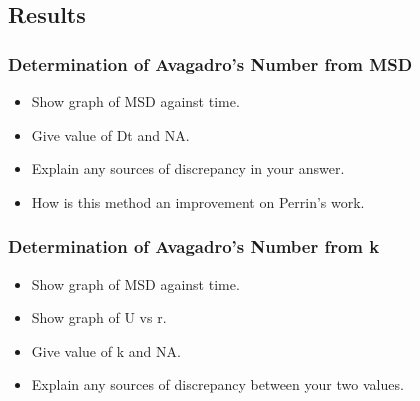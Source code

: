 \documentclass[12pt,a4paper,twoside]{article}
\begin{document}
\subsection{Results}

\subsubsection{Determination of Avagadro's Number from MSD}
 \begin{itemize}
	\item Show graph of MSD against time.
	\item Give value of Dt and NA.
	\item Explain any sources of discrepancy in your answer.
	\item How is this method an improvement on Perrin's work.
\end{itemize}

\subsubsection{Determination of Avagadro's Number from k}
 \begin{itemize}
	\item Show graph of MSD against time.
	\item Show graph of U vs r.
	\item Give value of k and NA.
	\item Explain any sources of discrepancy between your two values.
\end{itemize}
\end{document}
